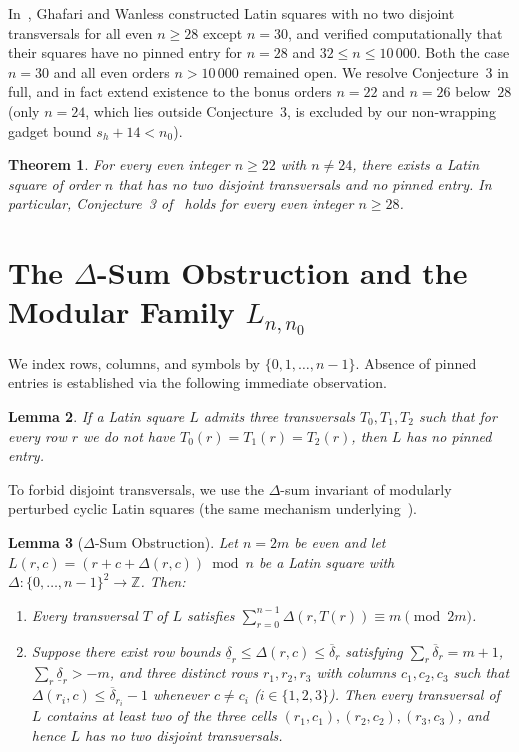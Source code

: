 \documentclass[11pt]{article}
\newtheorem{theorem}{Theorem}
\newtheorem{lemma}[theorem]{Lemma}
\begin{document}
In~\cite{ghafariwanless2026}, Ghafari and Wanless constructed Latin squares with no two disjoint transversals for all even $n \ge 28$ except $n = 30$, and verified computationally that their squares have no pinned entry for $n = 28$ and $32 \le n \le 10\,000$. Both the case $n = 30$ and all even orders $n > 10\,000$ remained open. We resolve Conjecture~3 in full, and in fact extend existence to the bonus orders $n = 22$ and $n = 26$ below~$28$ (only $n = 24$, which lies outside Conjecture~3, is excluded by our non-wrapping gadget bound $s_h + 14 < n_0$).

\begin{theorem}\label{thm:main}
For every even integer $n \ge 22$ with $n \ne 24$, there exists a Latin square of order $n$ that has no two disjoint transversals and no pinned entry. In particular, Conjecture~3 of~\cite{ghafariwanless2026} holds for every even integer $n \ge 28$.
\end{theorem}

\section{The $\Delta$-Sum Obstruction and the Modular Family $L_{n, n_0}$}

We index rows, columns, and symbols by $\{0, 1, \dots, n-1\}$. Absence of pinned entries is established via the following immediate observation.

\begin{lemma}\label{lem:three}
If a Latin square $L$ admits three transversals $T_0, T_1, T_2$ such that for every row $r$ we do not have $T_0(r) = T_1(r) = T_2(r)$, then $L$ has no pinned entry.
\end{lemma}

To forbid disjoint transversals, we use the $\Delta$-sum invariant of modularly perturbed cyclic Latin squares (the same mechanism underlying~\cite{ghafariwanless2026}).

\begin{lemma}[$\Delta$-Sum Obstruction]\label{lem:delta}
Let $n = 2m$ be even and let $L(r, c) = (r + c + \Delta(r, c)) \bmod n$ be a Latin square with $\Delta : \{0,\dots,n-1\}^2 \to \mathbb{Z}$. Then:
\begin{enumerate}
  \item Every transversal $T$ of $L$ satisfies $\sum_{r=0}^{n-1} \Delta(r, T(r)) \equiv m \pmod{2m}$.
  \item Suppose there exist row bounds $\underline{\delta}_r \le \Delta(r, c) \le \overline{\delta}_r$ satisfying $\sum_r \overline{\delta}_r = m + 1$, $\sum_r \underline{\delta}_r > -m$, and three distinct rows $r_1, r_2, r_3$ with columns $c_1, c_2, c_3$ such that $\Delta(r_i, c) \le \overline{\delta}_{r_i} - 1$ whenever $c \ne c_i$ ($i \in \{1, 2, 3\}$). Then every transversal of $L$ contains at least two of the three cells $(r_1, c_1), (r_2, c_2), (r_3, c_3)$, and hence $L$ has no two disjoint transversals.
\end{enumerate}
\end{lemma}
\end{document}
